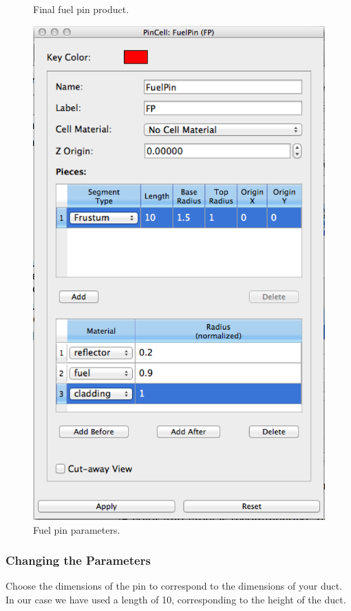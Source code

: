 \begin{figure}
\begin{minipage}{.45\textwidth}
\begin{center}
	 \caption{Final fuel pin product.}
  	\label{fig:Rect6}
      \end{center}
\end{minipage} \hspace{.5cm}%
\begin{minipage}{.45\textwidth}
  \centering
	\includegraphics[width=0.82\linewidth]{Images/rect-pin-params.png}
	\caption{Fuel pin parameters.}
	\label{fig:Rect5}
\end{minipage}
\end{figure}

\subsubsection{Changing the Parameters}

Choose the dimensions of the pin to correspond to the dimensions of your duct.  In our case we have used a length of 10, corresponding to the height of the duct.


